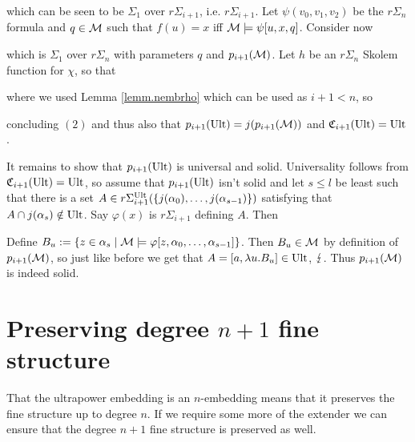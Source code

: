 {which can be seen to be $\Sigma_1$ over $r\Sigma_{i+1}$, i.e. $r\Sigma_{i+1}$. Let $\psi(v_0,v_1,v_2)$ be the $r\Sigma_n$ formula and $q\in\operatorname{\mathcal{M}}$ such that $f(u)=x$ iff $\operatorname{\mathcal{M}}\models\psi[u,x,q]$. Consider now

which is $\Sigma_1$ over $r\Sigma_n$ with parameters $q$ and $p_{i+1}(\operatorname{\mathcal{M}})$. Let $h$ be an $r\Sigma_n$ Skolem function for $\chi$, so that

where we used Lemma \ref{lemm.nembrho} which can be used as $i+1<n$, so

concluding $(2)$ and thus also that $p_{i+1}(\operatorname{Ult})=j(p_{i+1}(\operatorname{\mathcal{M}}))$ and $\mathfrak C_{i+1}(\operatorname{Ult})=\operatorname{Ult}$.

\qquad It remains to show that $p_{i+1}(\operatorname{Ult})$ is universal and solid. Universality follows from $\mathfrak C_{i+1}(\operatorname{Ult})=\operatorname{Ult}$, so assume that $p_{i+1}(\operatorname{Ult})$ isn't solid and let $s\leq l$ be least such that there is a set $A\in r\Sigma_{i+1}^{\operatorname{Ult}}(\{j(\alpha_0),\hdots,j(\alpha_{s-1})\})$ satisfying that $A\cap j(\alpha_s)\notin\operatorname{Ult}$. Say $\varphi(x)$ is $r\Sigma_{i+1}$ defining $A$. Then

Define $B_u:=\{z\in\alpha_s\mid\operatorname{\mathcal{M}}\models\varphi[z,\alpha_0,\hdots,\alpha_{s-1}]\}$. Then $B_u\in\operatorname{\mathcal{M}}$ by definition of $p_{i+1}(\operatorname{\mathcal{M}})$, so just like before we get that $A=[a,\lambda u.B_u]\in\operatorname{Ult}$, $\operatorname{\lightning}$. Thus $p_{i+1}(\operatorname{\mathcal{M}})$ is indeed solid.
}


\section{Preserving degree $n+1$ fine structure}

That the ultrapower embedding is an $n$-embedding means that it preserves the fine structure up to degree $n$. If we require some more of the extender we can ensure that the degree $n+1$ fine structure is preserved as well.


